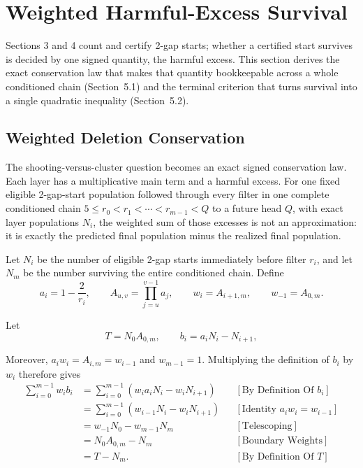 \section{Weighted Harmful-Excess Survival}
\label{sec:weighted-harmful-excess-survival}

Sections 3 and 4 count and certify 2-gap starts; whether a certified start
survives is decided by one signed quantity, the harmful excess. This section
derives the exact conservation law that makes that quantity bookkeepable
across a whole conditioned chain (Section~5.1) and the terminal criterion that
turns survival into a single quadratic inequality (Section~5.2).

\subsection{Weighted Deletion Conservation}
\label{sec:weighted-deletion-conservation}

The shooting-versus-cluster question becomes an exact signed conservation
law. Each layer has a multiplicative main term and a harmful excess. For one
fixed eligible 2-gap-start population followed through every filter in one
complete conditioned chain $5\le r_0\lt r_1\lt\cdots\lt r_{m-1}\lt Q$ to a
future head $Q$, with exact layer populations $N_i$, the weighted sum of
those excesses is not an approximation: it is exactly the predicted final
population minus the realized final population.

Let $N_i$ be the number of eligible 2-gap starts immediately before filter
$r_i$, and let $N_m$ be the number surviving the entire conditioned chain.
Define
\begin{equation*}
a_i=1-\frac2{r_i},
\qquad
A_{u,v}=\prod_{j=u}^{v-1}a_j,
\qquad
w_i=A_{i+1,m},
\qquad
w_{-1}=A_{0,m}.
\end{equation*}

Let
\begin{equation*}
T=N_0A_{0,m},
\qquad
b_i=a_iN_i-N_{i+1},
\end{equation*}

Moreover, $a_iw_i=A_{i,m}=w_{i-1}$ and $w_{m-1}=1$. Multiplying the
definition of $b_i$ by $w_i$ therefore gives
\begin{equation*}
\begin{aligned}
\sum_{i=0}^{m-1}w_ib_i
&=\sum_{i=0}^{m-1}
  \left(w_ia_iN_i-w_iN_{i+1}\right)
&&[\text{By Definition Of }b_i]\\
&=\sum_{i=0}^{m-1}
  \left(w_{i-1}N_i-w_iN_{i+1}\right)
&&[\text{Identity }a_iw_i=w_{i-1}]\\
&=w_{-1}N_0-w_{m-1}N_m
&&[\text{Telescoping}]\\
&=N_0A_{0,m}-N_m
&&[\text{Boundary Weights}]\\
&=T-N_m.
&&[\text{By Definition Of }T]
\end{aligned}
\end{equation*}


